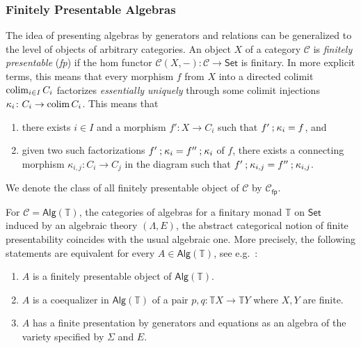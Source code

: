 \documentclass[a4paper, UKenglish, numberwithinsect, thm-restate, cleveref, final]{lipics-v2021}
\theoremstyle{plain}
\theoremstyle{definition}
\newcommand{\C}{\ensuremath{\mathcal{C}}}
\newcommand{\T}{\ensuremath{\mathbb{T}}\xspace}
\newcommand{\seq}{\ensuremath{\mathbin{\text{\upshape;}}}}
\newcommand{\Alg}{\ensuremath{\mathsf{Alg}}}
\newcommand{\Set}{\ensuremath{\mathsf{Set}}\xspace}
\def\colim{\qopname\relax m{colim}}
\newcommand{\fp}{\mathsf{fp}}
\newcommand{\Cfp}{\C_\fp}
\def\colim{\qopname\relax m{colim}}
\numberwithin{equation}{section}
\begin{document}
\subsubsection*{Finitely Presentable Algebras} The idea of presenting algebras by generators and relations can be generalized to the level of objects of arbitrary categories. An object \(X\) of a category $\C$ is \emph{finitely presentable} (\emph{fp}) if the hom functor \(\C(X, -)\colon \C\to \Set\) is finitary. In more explicit terms, this means that every morphism $f$ from $X$ into a directed colimit $\colim_{i \in I} C_i$ factorizes \emph{essentially uniquely} through some  colimit injections $\kappa_i\colon C_i \to \colim C_i$. This means that
\begin{enumerate}[(1)]
\item there exists $i \in I$ and a morphism $f'\colon X \to C_i$
  such that $f' \seq \kappa_{i} = f$, and
\item\label{cond:fp-2} given two such factorizations $ f' \seq \kappa_{i} =  f'' \seq \kappa_{i}$
  of $f$, there exists a connecting morphism $\kappa_{i,j}\colon C_i \to
  C_j$ in the diagram such that $f' \seq \kappa_{i,j}  = f'' \seq \kappa_{i,j} $.
\end{enumerate}
We denote the class of all finitely presentable object of \(\C\) by \(\Cfp\). 

For $\C=\Alg(\T)$, the categories of algebras for a finitary monad $\T$ on $\Set$ induced by an algebraic theory $(\Lambda,E)$, the abstract categorical notion of finite presentability coincides with the usual algebraic one. More precisely, the following statements are equivalent for every $A\in \Alg(\T)$, see e.g.~\cite[Prop.~11.28]{arv10}:
\begin{enumerate}[(1)]
\item $A$ is a finitely presentable object of $\Alg(\T)$.
\item $A$ is a coequalizer in $\Alg(\T)$ of a pair $p,q\colon \T X\to \T Y$ where $X,Y$ are finite.
\item $A$ has a finite presentation by generators and equations as an algebra of the variety specified by $\Sigma$ and $E$.
\end{enumerate} 
\end{document}
